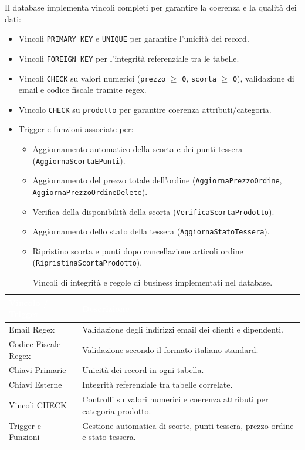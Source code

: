 \documentclass[a4paper,12pt]{article}
\renewcommand{\arraystretch}{1.2} %
\begin{document}
Il database implementa vincoli completi per garantire la coerenza e la qualità dei dati:

\begin{itemize}
    \item Vincoli \texttt{PRIMARY KEY} e \texttt{UNIQUE} per garantire l’unicità dei record.
    \item Vincoli \texttt{FOREIGN KEY} per l’integrità referenziale tra le tabelle.
    \item Vincoli \texttt{CHECK} su valori numerici (\texttt{prezzo} $\geq$ \texttt{0}, \texttt{scorta} $\geq$ \texttt{0}), validazione di email e codice fiscale tramite regex.
    \item Vincolo \texttt{CHECK} su \texttt{prodotto} per garantire coerenza attributi/categoria.
    \item Trigger e funzioni associate per:
    \begin{itemize}
        \item Aggiornamento automatico della scorta e dei punti tessera (\texttt{AggiornaScortaEPunti}).
        \item Aggiornamento del prezzo totale dell'ordine (\texttt{AggiornaPrezzoOrdine}, \texttt{AggiornaPrezzoOrdineDelete}).
        \item Verifica della disponibilità della scorta (\texttt{VerificaScortaProdotto}).
        \item Aggiornamento dello stato della tessera (\texttt{AggiornaStatoTessera}).
        \item Ripristino scorta e punti dopo cancellazione articoli ordine (\texttt{RipristinaScortaProdotto}).
    \end{itemize}
\end{itemize}

\vspace{0.5em}
\renewcommand{\arraystretch}{1.3}
\begin{table}[ht]
\centering
\setlength{\tabcolsep}{8pt}
\begin{tabular}{|>{\centering\arraybackslash}m{4cm}|>{\raggedright\arraybackslash}m{10cm}|}
\hline
\rowcolor{myblue}\textcolor{white}{\textbf{Vincolo / Trigger}} & \textcolor{white}{\textbf{Descrizione}} \\
\hline
\rowcolor{mygray} Email Regex & Validazione degli indirizzi email dei clienti e dipendenti. \\
Codice Fiscale Regex & Validazione secondo il formato italiano standard. \\
\rowcolor{mygray} Chiavi Primarie & Unicità dei record in ogni tabella. \\
Chiavi Esterne & Integrità referenziale tra tabelle correlate. \\
\rowcolor{mygray} Vincoli CHECK & Controlli su valori numerici e coerenza attributi per categoria prodotto. \\
Trigger e Funzioni & Gestione automatica di scorte, punti tessera, prezzo ordine e stato tessera. \\
\hline
\end{tabular}
\caption{Vincoli di integrità e regole di business implementati nel database.}
\end{table}
\end{document}
